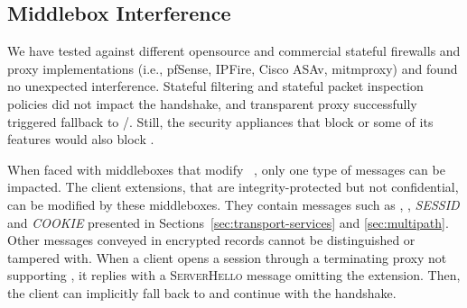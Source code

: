 

\subsection{Middlebox Interference}
\label{sec:middlebox}

We have tested \tcpls against different opensource and commercial 
stateful
firewalls and proxy implementations (i.e., pfSense, IPFire, Cisco ASAv,
mitmproxy) and found no unexpected interference. Stateful filtering and stateful
packet inspection policies did not impact the \tcpls handshake, and transparent 
\tls
proxy successfully triggered \tcpls fallback to \tls/\tcp. Still, the security
appliances that block  or some of its features
\cite{lee2019matls,Bock_China,raman2020measuring} would also block \tcpls.

When faced with middleboxes that modify ~\cite{Bock_China,raman2020measuring}, only one type of \tcpls 
messages can be impacted. The client \tls extensions, that are 
integrity-protected but not confidential, can be modified by these middleboxes. 
They contain messages such as \hello, \join, \textit{SESSID} and 
\textit{COOKIE} presented 
in Sections~\ref{sec:transport-services} and \ref{sec:multipath}. Other messages 
conveyed in encrypted \tls records cannot be distinguished or tampered with.
When a client opens a \tcpls session
through a \tls terminating proxy not supporting \tcpls, it replies 
with 
a \textsc{ServerHello} message omitting the \hello extension. Then, the client 
can implicitly fall back to \tls and continue with the handshake.

